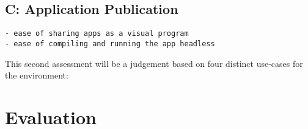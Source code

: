\subsection*{C: Application Publication}
\begin{lstlisting}
- ease of sharing apps as a visual program
- ease of compiling and running the app headless
\end{lstlisting}









This second assessment will be a judgement based on four distinct use-cases for the environment:


\section{ Evaluation }





